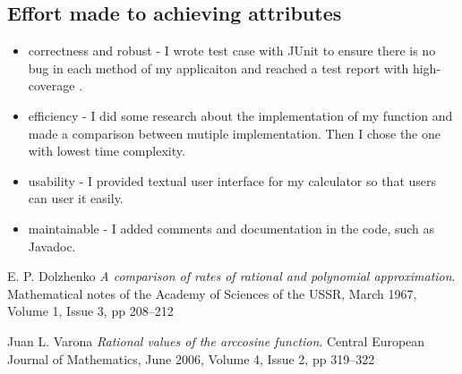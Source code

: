 \documentclass[10pt]{article}
\begin{document}
\subsection{Effort made to achieving attributes}
\begin{itemize}
    \item correctness and robust - I wrote test case with JUnit to ensure there is no bug in each method of my applicaiton and reached a test report with high-coverage .
    \item efficiency - I did some research about the implementation of my function and made a comparison between mutiple implementation. Then I chose the one with lowest time complexity.
    \item usability - I provided textual user interface for my calculator so that users can user it easily.
    \item maintainable - I added comments and documentation in the code, such as Javadoc.
\end{itemize}

\pagebreak
\begin{thebibliography}{9}
E. P. Dolzhenko
\textit{A comparison of rates of rational and polynomial approximation}. 
Mathematical notes of the Academy of Sciences of the USSR, March 1967, Volume 1, Issue 3, pp 208–212

Juan L. Varona
\textit{Rational values of the arccosine function}. 
Central European Journal of Mathematics, June 2006, Volume 4, Issue 2, pp 319–322
\end{thebibliography}
 
\end{document}
